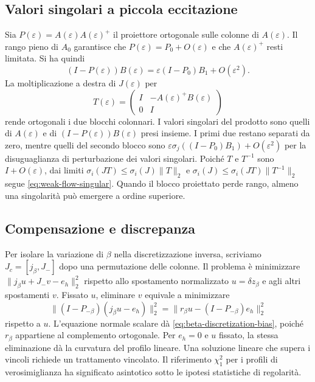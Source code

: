\subsection{Valori singolari a piccola eccitazione}
Sia $P(\varepsilon)=A(\varepsilon)A(\varepsilon)^+$ il proiettore ortogonale sulle colonne di $A(\varepsilon)$. Il rango pieno di $A_0$ garantisce che $P(\varepsilon)=P_0+O(\varepsilon)$ e che $A(\varepsilon)^+$ resti limitata. Si ha quindi
\[
 (I-P(\varepsilon))B(\varepsilon)=\varepsilon(I-P_0)B_1+O(\varepsilon^2).
\]
La moltiplicazione a destra di $J(\varepsilon)$ per
\[
 T(\varepsilon)=
 \begin{pmatrix} I&-A(\varepsilon)^+B(\varepsilon)\\0&I \end{pmatrix}
\]
rende ortogonali i due blocchi colonnari. I valori singolari del prodotto sono quelli di $A(\varepsilon)$ e di $(I-P(\varepsilon))B(\varepsilon)$ presi insieme. I primi due restano separati da zero, mentre quelli del secondo blocco sono $\varepsilon\sigma_j((I-P_0)B_1)+O(\varepsilon^2)$ per la disuguaglianza di perturbazione dei valori singolari. Poiché $T$ e $T^{-1}$ sono $I+O(\varepsilon)$, dai limiti $\sigma_i(JT)\leq \sigma_i(J)\|T\|_2$ e $\sigma_i(J)\leq \sigma_i(JT)\|T^{-1}\|_2$ segue \eqref{eq:weak-flow-singular}. Quando il blocco proiettato perde rango, almeno una singolarità può emergere a ordine superiore.

\subsection{Compensazione e discrepanza}
Per isolare la variazione di $\beta$ nella discretizzazione inversa, scriviamo $J_c=[j_\beta,J_-]$ dopo una permutazione delle colonne. Il problema è minimizzare $\|j_\beta u+J_-v-e_h\|_2^2$ rispetto allo spostamento normalizzato $u=\delta z_\beta$ e agli altri spostamenti $v$. Fissato $u$, eliminare $v$ equivale a minimizzare
\[
 \|(I-P_{-\beta})(j_\beta u-e_h)\|_2^2
 = \|r_\beta u-(I-P_{-\beta})e_h\|_2^2
\]
rispetto a $u$. L'equazione normale scalare dà \eqref{eq:beta-discretization-bias}, poiché $r_\beta$ appartiene al complemento ortogonale. Per $e_h=0$ e $u$ fissato, la stessa eliminazione dà la curvatura del profilo lineare. Una soluzione lineare che supera i vincoli richiede un trattamento vincolato. Il riferimento $\chi_1^2$ per i profili di verosimiglianza ha significato asintotico sotto le ipotesi statistiche di regolarità.
